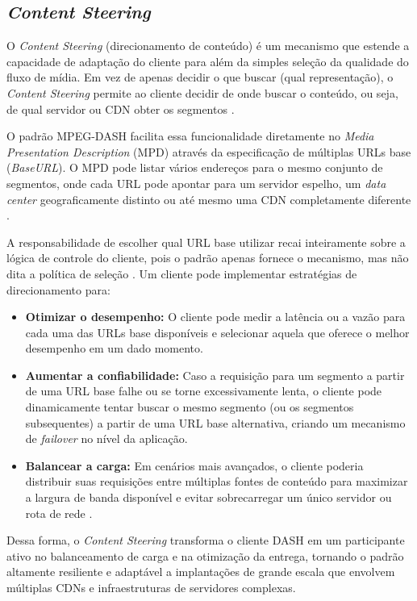\subsection{\textit{Content Steering}}

O \textit{Content Steering} (direcionamento de conteúdo) é um mecanismo que estende a capacidade de adaptação do cliente para além da simples seleção da qualidade do fluxo de mídia. Em vez de apenas decidir o que buscar (qual representação), o \textit{Content Steering} permite ao cliente decidir de onde buscar o conteúdo, ou seja, de qual servidor ou CDN obter os segmentos \cite{sodagar2011mpegdash}.

O padrão MPEG-DASH facilita essa funcionalidade diretamente no \textit{Media Presentation Description} (MPD) através da especificação de múltiplas URLs base (\textit{BaseURL}). O MPD pode listar vários endereços para o mesmo conjunto de segmentos, onde cada URL pode apontar para um servidor espelho, um \textit{data center} geograficamente distinto ou até mesmo uma CDN completamente diferente \cite{sodagar2011mpegdash}.

A responsabilidade de escolher qual URL base utilizar recai inteiramente sobre a lógica de controle do cliente, pois o padrão apenas fornece o mecanismo, mas não dita a política de seleção \cite{sodagar2011mpegdash}. Um cliente pode implementar estratégias de direcionamento para:
\begin{itemize}
    \item \textbf{Otimizar o desempenho:} O cliente pode medir a latência ou a vazão para cada uma das URLs base disponíveis e selecionar aquela que oferece o melhor desempenho em um dado momento.
    \item \textbf{Aumentar a confiabilidade:} Caso a requisição para um segmento a partir de uma URL base falhe ou se torne excessivamente lenta, o cliente pode dinamicamente tentar buscar o mesmo segmento (ou os segmentos subsequentes) a partir de uma URL base alternativa, criando um mecanismo de \textit{failover} no nível da aplicação.
    \item \textbf{Balancear a carga:} Em cenários mais avançados, o cliente poderia distribuir suas requisições entre múltiplas fontes de conteúdo para maximizar a largura de banda disponível e evitar sobrecarregar um único servidor ou rota de rede \cite{sodagar2011mpegdash}.
\end{itemize}

Dessa forma, o \textit{Content Steering} transforma o cliente DASH em um participante ativo no balanceamento de carga e na otimização da entrega, tornando o padrão altamente resiliente e adaptável a implantações de grande escala que envolvem múltiplas CDNs e infraestruturas de servidores complexas.


